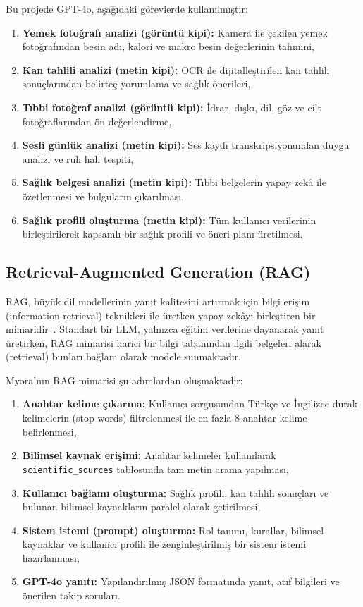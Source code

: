 Bu projede GPT-4o, aşağıdaki görevlerde kullanılmıştır:
\begin{enumerate}
    \item \textbf{Yemek fotoğrafı analizi (görüntü kipi):} Kamera ile çekilen yemek fotoğrafından besin adı, kalori ve makro besin değerlerinin tahmini,
    \item \textbf{Kan tahlili analizi (metin kipi):} OCR ile dijitalleştirilen kan tahlili sonuçlarından belirteç yorumlama ve sağlık önerileri,
    \item \textbf{Tıbbi fotoğraf analizi (görüntü kipi):} İdrar, dışkı, dil, göz ve cilt fotoğraflarından ön değerlendirme,
    \item \textbf{Sesli günlük analizi (metin kipi):} Ses kaydı transkripsiyonundan duygu analizi ve ruh hali tespiti,
    \item \textbf{Sağlık belgesi analizi (metin kipi):} Tıbbi belgelerin yapay zekâ ile özetlenmesi ve bulguların çıkarılması,
    \item \textbf{Sağlık profili oluşturma (metin kipi):} Tüm kullanıcı verilerinin birleştirilerek kapsamlı bir sağlık profili ve öneri planı üretilmesi.
\end{enumerate}

\subsection{Retrieval-Augmented Generation (RAG)}

RAG, büyük dil modellerinin yanıt kalitesini artırmak için bilgi erişim (information retrieval) teknikleri ile üretken yapay zekâyı birleştiren bir mimaridir~\cite{Lewis2020RAG}. Standart bir LLM, yalnızca eğitim verilerine dayanarak yanıt üretirken, RAG mimarisi harici bir bilgi tabanından ilgili belgeleri alarak (retrieval) bunları bağlam olarak modele sunmaktadır.

Myora'nın RAG mimarisi şu adımlardan oluşmaktadır:
\begin{enumerate}
    \item \textbf{Anahtar kelime çıkarma:} Kullanıcı sorgusundan Türkçe ve İngilizce durak kelimelerin (stop words) filtrelenmesi ile en fazla 8 anahtar kelime belirlenmesi,
    \item \textbf{Bilimsel kaynak erişimi:} Anahtar kelimeler kullanılarak \texttt{scientific\_sources} tablosunda tam metin arama yapılması,
    \item \textbf{Kullanıcı bağlamı oluşturma:} Sağlık profili, kan tahlili sonuçları ve bulunan bilimsel kaynakların paralel olarak getirilmesi,
    \item \textbf{Sistem istemi (prompt) oluşturma:} Rol tanımı, kurallar, bilimsel kaynaklar ve kullanıcı profili ile zenginleştirilmiş bir sistem istemi hazırlanması,
    \item \textbf{GPT-4o yanıtı:} Yapılandırılmış JSON formatında yanıt, atıf bilgileri ve önerilen takip soruları.
\end{enumerate}

